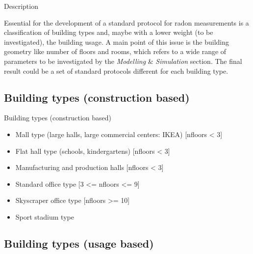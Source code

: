\documentclass[xcolor=svgnames]{beamer}
\newcommand{\1}{\'{\i}}
\begin{document}
\frame{\tableofcontents[currentsection]}

\begin{frame}{Description}

Essential for the development of a standard protocol for radon measurements is a classification of building types and, maybe with a lower weight (to be investigated), the building usage. A main point of this issue is the building geometry like number of floors and rooms, which refers to a wide range of parameters to be investigated by the \textit{Modelling} \& \textit{Simulation} section. The final result could be a set of standard protocols different for each building type.

\end{frame}

\subsection{Building types (construction based)}

\begin{frame}{Building types (construction based)}
\begin{itemize}

\item Mall type (large halls, large commercial centers: IKEA) [nfloors < 3]
\item Flat hall type (schools, kindergartens) [nfloors < 3]
\item Manufacturing and production halls [nfloors < 3]
\item Standard office  type [3 <= nfloors <= 9]
\item Skyscraper office type [nfloors >= 10]
\item Sport stadium type

\end{itemize}

\end{frame}



\subsection{Building types (usage based)}
\end{document}
